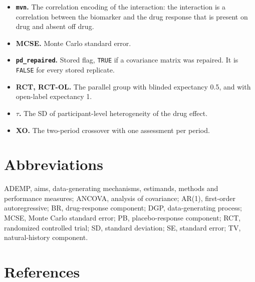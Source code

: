 \documentclass[
  11pt,
]{article}
\begin{document}
\begin{itemize}
  \textbf{\texttt{mean\_moderation}.} The mean-shift encoding of the biomarker-by-drug interaction.
\item
  \textbf{\texttt{mvn}.} The correlation encoding of the interaction: the interaction is a correlation between the biomarker and the drug response that is present on drug and absent off drug.
\item
  \textbf{MCSE.} Monte Carlo standard error.
\item
  \textbf{\texttt{pd\_repaired}.} Stored flag, \texttt{TRUE} if a covariance matrix was repaired. It is \texttt{FALSE} for every stored replicate.
\item
  \textbf{RCT, RCT-OL.} The parallel group with blinded expectancy 0.5, and with open-label expectancy 1.
\item
  \textbf{\(\tau\).} The SD of participant-level heterogeneity of the drug effect.
\item
  \textbf{XO.} The two-period crossover with one assessment per period.
\end{itemize}

\section{Abbreviations}\label{abbreviations}

ADEMP, aims, data-generating mechanisms, estimands, methods and performance measures; ANCOVA, analysis of covariance; AR(1), first-order autoregressive; BR, drug-response component; DGP, data-generating process; MCSE, Monte Carlo standard error; PB, placebo-response component; RCT, randomized controlled trial; SD, standard deviation; SE, standard error; TV, natural-history component.

\section{References}\label{references}
\end{document}
